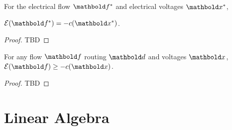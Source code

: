 \begin{lem}\label{lem:a3}
For the electrical flow $\s{\vf}$ and electrical voltages $\s{\vx}$,\par\noindent $\mathcal{E}(\s{\vf}) = -c(\s{\vx})$.
\end{lem}
\begin{proof} TBD
\end{proof}

\begin{lem}\label{lem:a4}
For any flow $\vf$ routing $\vd$ and voltages $\vx$, $\mathcal{E}(\vf) \geq -c(\vx)$.
\end{lem}
\begin{proof} TBD
\end{proof}

\section{Linear Algebra}

